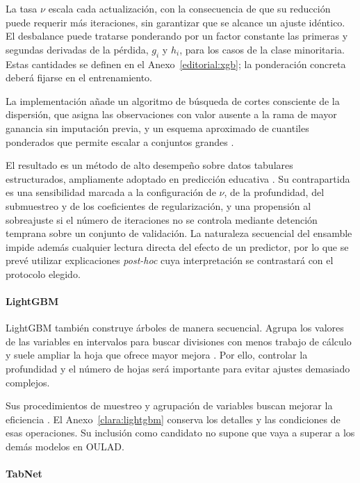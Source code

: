 La tasa $\nu$ escala cada actualización, con la consecuencia de que su reducción puede requerir más iteraciones, sin garantizar que se alcance un ajuste idéntico. El desbalance puede tratarse ponderando por un factor constante las primeras y segundas derivadas de la pérdida, $g_i$ y $h_i$, para los casos de la clase minoritaria. Estas cantidades se definen en el Anexo~\ref{editorial:xgb}; la ponderación concreta deberá fijarse en el entrenamiento. 

La implementación añade un algoritmo de búsqueda de cortes consciente de la dispersión, que asigna las observaciones con valor ausente a la rama de mayor ganancia sin imputación previa, y un esquema aproximado de cuantiles ponderados que permite escalar a conjuntos grandes \cite{chen2016}.

El resultado es un método de alto desempeño sobre datos tabulares estructurados, ampliamente adoptado en predicción educativa \cite{eks30080,educsci11090552,computers15030164}. Su contrapartida es una sensibilidad marcada a la configuración de $\nu$, de la profundidad, del submuestreo y de los coeficientes de regularización, y una propensión al sobreajuste si el número de iteraciones no se controla mediante detención temprana sobre un conjunto de validación. La naturaleza secuencial del ensamble impide además cualquier lectura directa del efecto de un predictor, por lo que se prevé utilizar explicaciones \textit{post-hoc} cuya interpretación se contrastará con el protocolo elegido.

\paragraph{LightGBM}

LightGBM también construye árboles de manera secuencial. Agrupa los valores de las variables en intervalos para buscar divisiones con menos trabajo de cálculo y suele ampliar la hoja que ofrece mayor mejora \cite{revlightfeatures,revlighttuning}. Por ello, controlar la profundidad y el número de hojas será importante para evitar ajustes demasiado complejos.

Sus procedimientos de muestreo y agrupación de variables buscan mejorar la eficiencia \cite{ke2017}. El Anexo~\ref{clara:lightgbm} conserva los detalles y las condiciones de esas operaciones. Su inclusión como candidato no supone que vaya a superar a los demás modelos en OULAD.

\paragraph{TabNet}

